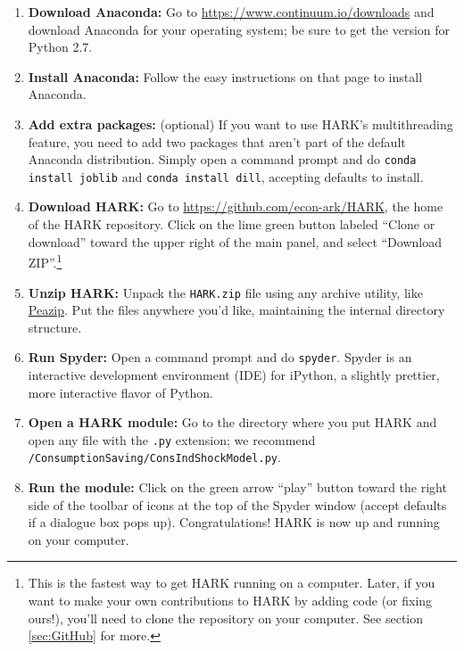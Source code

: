 \documentclass[12pt,titlepage,letterpaper]{econtex}
\begin{document}
\begin{enumerate}
\item \textbf{Download Anaconda:} Go to \href{https://www.continuum.io/downloads}{https://www.continuum.io/downloads} and download Anaconda for your operating system; be sure to get the version for Python 2.7.

\item \textbf{Install Anaconda:} Follow the easy instructions on that page to install Anaconda.

\item \textbf{Add extra packages:} (optional) If you want to use HARK's multithreading feature, you need to add two packages that aren't part of the default Anaconda distribution.  Simply open a command prompt and do \texttt{conda install joblib} and \texttt{conda install dill}, accepting defaults to install.

\item \textbf{Download HARK:} Go to \href{https://github.com/econ-ark/HARK}{https://github.com/econ-ark/HARK}, the home of the HARK repository.  Click on the lime green button labeled ``Clone or download'' toward the upper right of the main panel, and select ``Download ZIP''.\footnote{This is the fastest way to get HARK running on a computer.  Later, if you want to make your own contributions to HARK by adding code (or fixing ours!), you'll need to clone the repository on your computer.  See section \ref{sec:GitHub} for more.}

\item \textbf{Unzip HARK:} Unpack the \texttt{HARK.zip} file using any archive utility, like \href{http://www.peazip.org/}{Peazip}.  Put the files anywhere you'd like, maintaining the internal directory structure.

\item \textbf{Run Spyder:} Open a command prompt and do \texttt{spyder}.  Spyder is an interactive development environment (IDE) for iPython, a slightly prettier, more interactive flavor of Python.

\item \textbf{Open a HARK module:} Go to the directory where you put HARK and open any file with the \texttt{.py} extension; we recommend \texttt{/ConsumptionSaving/ConsIndShockModel.py}.

\item \textbf{Run the module:} Click on the green arrow ``play'' button toward the right side of the toolbar of icons at the top of the Spyder window (accept defaults if a dialogue box pops up).  Congratulations! HARK is now up and running on your computer.
\end{enumerate}
\end{document}
